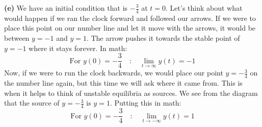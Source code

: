 \documentclass[a4paper,12pt]{article}
\begin{document}
\textbf{(e)} We have an initial condition that is $-\frac{3}{4}$ at $t=0$. Let's think about what would happen if we ran the clock forward and followed our arrows. If we were to place this point on our number line and let it move with the arrows, it would be between $y=-1$ and $y=1$. The arrow pushes it towards the stable point of $y=-1$ where it stays forever. In math:
$$ \boxed{\text{For $y(0)=-\frac{3}{4}$}\quad :\quad \lim_{t\to \infty} y(t) = -1} $$
Now, if we were to run the clock backwards, we would place our point $y=-\frac{3}{4}$ on the number line again, but this time we will ask where it came from. This is when it helps to think of unstable equilibria as sources. We see from the diagram that the source of $y=-\frac{3}{4}$ is $y=1$. Putting this in math:
$$ \boxed{\text{For $y(0)=-\frac{3}{4}$}\quad:\quad \lim_{t\to -\infty} y(t) = 1} $$
\end{document}
